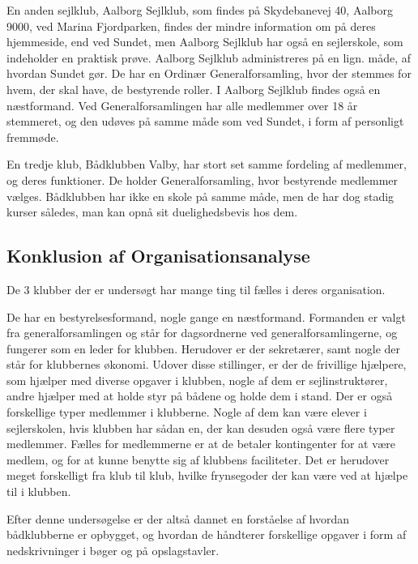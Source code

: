 En anden sejlklub, Aalborg Sejlklub, som findes på Skydebanevej 40, Aalborg 9000, ved Marina Fjordparken, findes der
mindre information om på deres hjemmeside, end ved Sundet, men Aalborg Sejlklub har også en sejlerskole, som indeholder en
praktisk prøve.  Aalborg Sejlklub administreres på en lign. måde, af hvordan Sundet gør. De har en
Ordinær Generalforsamling, hvor der stemmes for hvem, der skal have, de bestyrende roller. I Aalborg Sejlklub findes også
en næstformand. Ved Generalforsamlingen har alle medlemmer over 18 år stemmeret, og den udøves på samme måde som ved
Sundet, i form af personligt fremmøde.\citep{AalborgSejlklub}

En tredje klub, Bådklubben Valby, har stort set samme fordeling af medlemmer, og deres funktioner. De holder
Generalforsamling, hvor bestyrende medlemmer vælges. Bådklubben har ikke en skole på samme måde, men de har dog stadig
kurser således, man kan opnå sit duelighedsbevis hos dem.\citep{BaadklubbenValby}


\subsection{Konklusion af Organisationsanalyse}

De 3 klubber der er undersøgt har mange ting til fælles i deres organisation.

De har en bestyrelsesformand, nogle gange en næstformand. Formanden er valgt fra generalforsamlingen og står for
dagsordnerne ved generalforsamlingerne, og fungerer som en leder for klubben. Herudover er der sekretærer, samt nogle
der står for klubbernes økonomi. Udover disse stillinger, er der de frivillige hjælpere, som hjælper med diverse opgaver
i klubben, nogle af dem er sejlinstruktører, andre hjælper med at holde styr på bådene og holde dem i stand. Der er også
forskellige typer medlemmer i klubberne. Nogle af dem kan være elever i sejlerskolen, hvis klubben har sådan en, der kan
desuden også være flere typer medlemmer. Fælles for medlemmerne er at de betaler kontingenter for at være medlem, og for
at kunne benytte sig af klubbens faciliteter. Det er herudover meget forskelligt fra klub til klub, hvilke frynsegoder
der kan være ved at hjælpe til i klubben.

Efter denne undersøgelse er der altså dannet en forståelse af hvordan bådklubberne er opbygget, og hvordan de håndterer
forskellige opgaver i form af nedskrivninger i bøger og på opslagstavler.

